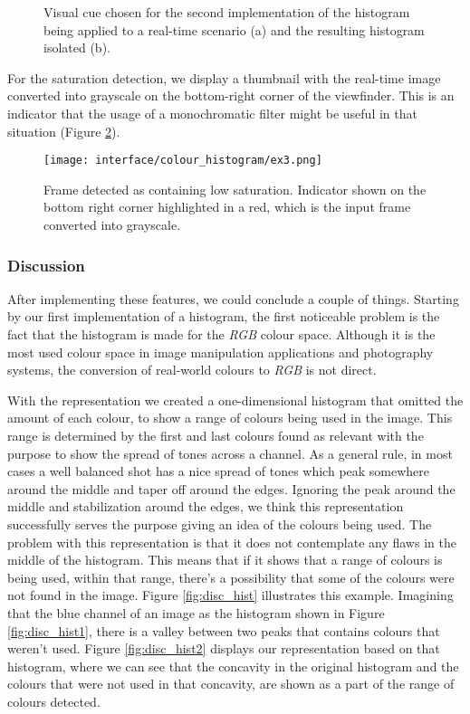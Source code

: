 \begin{figure}[htb]
	\centering
  \caption{Visual cue chosen for the second implementation of the histogram being applied to a real-time scenario (a) and the resulting histogram isolated (b). }
	\label{fig:hist_ex2}
\end{figure}

For the saturation detection, we display a thumbnail with the real-time image converted into grayscale on the bottom-right corner of the viewfinder. This is an indicator that the usage of a monochromatic filter might be useful in that situation (Figure \ref{fig:hist_ex3}).

\begin{figure}[htb]
	\centering
	\texttt{[image: interface/colour\_histogram/ex3.png]}
  	\caption{Frame detected as containing low saturation. Indicator shown on the bottom right corner highlighted in a red, which is the input frame converted into grayscale.}
	\label{fig:hist_ex3}
\end{figure}
  
\subsubsection{Discussion}
\label{subsub:disc_hist}
After implementing these features, we could conclude a couple of things. Starting by our first implementation of a histogram, the first noticeable problem is the fact that the histogram is made for the \emph{RGB} colour space. Although it is the most used colour space in image manipulation applications and photography systems, the conversion of real-world colours to \emph{RGB} is not direct.

With the representation we created a one-dimensional histogram that omitted the amount of each colour, to show a range of colours being used in the image. This range is determined by the first and last colours found as relevant with the purpose to show the spread of tones across a channel. As a general rule, in most cases a well balanced shot has a nice spread of tones which peak somewhere around the middle and taper off around the edges. Ignoring the peak around the middle and stabilization around the edges, we think this representation successfully serves the purpose giving an idea of the colours being used. The problem with this representation is that it does not contemplate any flaws in the middle of the histogram. This means that if it shows that a range of colours is being used, within that range, there's a possibility that some of the colours were not found in the image. Figure \ref{fig:disc_hist} illustrates this example. Imagining that the blue channel of an image as the histogram shown in Figure \ref{fig:disc_hist1}, there is a valley between two peaks that contains colours that weren't used. Figure \ref{fig:disc_hist2} displays our representation based on that histogram, where we can see that the concavity in the original histogram and the colours that were not used in that concavity, are shown as a part of the range of colours detected.

